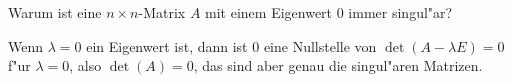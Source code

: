 Warum ist eine $n\times n$-Matrix $A$ mit einem Eigenwert 0
immer singul"ar?

\begin{loesung}
Wenn $\lambda=0$ ein Eigenwert ist, dann ist $0$ eine Nullstelle
von $\det(A-\lambda E)=0$ f"ur $\lambda=0$, also $\det(A)=0$,
das sind aber genau die singul"aren Matrizen.
\end{loesung}

